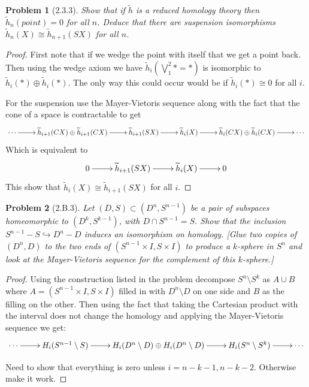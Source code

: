 \documentclass[10pt]{article}
\newcommand{\sk}{\vskip 10mm}
\newcommand{\rh}{\widetilde{h}}
\theoremstyle{plain}
\newtheorem{problem}{Problem}
\theoremstyle{remark}
\begin{document}
\sk

\begin{problem}[2.3.3]
  Show that if $\rh$ is a reduced homology theory then $\rh_n(point)=0$ for all
  $n$. Deduce that there are suspension isomorphisms $\rh_n(X)\cong\rh_{n+1}(SX)$
  for all $n$.
\end{problem}

\begin{proof}
  First note that if we wedge the point with itself that we get a point back.
  Then using the wedge axiom we have $\rh_i(\bigvee_1^2*=*)$ is isomorphic to
  $\rh_i(*)\oplus\rh_i(*)$. The only way this could occur would be if $\rh_i(*)\cong 0$
  for all $i$.

  For the suspension use the Mayer-Vietoris sequence along with the
  fact that the cone of a space is contractable to get
  \[
    \xymatrix{
      \cdots \ar[r] & \rh_{i+1}(CX)\oplus \rh_{i+1}(CX) \ar[r] & \rh_{i+1}(SX) \ar[r] & \rh_i(X) \ar[r] & \rh_i(CX)\oplus \rh_i(CX) \ar[r] & \cdots
    }
  \]
  Which is equivalent to
  \[
    \xymatrix{
      0 \ar[r] & \rh_{i+1}(SX) \ar[r] & \rh_i(X) \ar[r] & 0
      }
  \]
  This show that $\rh_i(X)\cong\rh_{i+1}(SX)$ for all $i$.
\end{proof}

\sk

\begin{problem}[2.B.3]
  Let $(D,S)\subset (D^n,S^{n-1})$ be a pair of subspaces homeomorphic to
  $(D^k,S^{k-1})$, with $D\cap S^{n-1}=S$. Show that the inclusion
  $S^{n-1}-S\hookrightarrow D^n-D$ induces an isomorphism on homology. [Glue two
  copies of $(D^n,D)$ to the two ends of $(S^{n-1}\times I,S\times I)$ to
  produce a $k$-sphere in $S^n$ and look at the Mayer-Vietoris sequence for the
  complement of this $k$-sphere.]
\end{problem}

\begin{proof}
  Using the construction listed in the problem decompose $S^n\setminus S^k$ as $A\cup B$
  where $A=(S^{n-1}\times I,S\times I)$ filled in with $D^n\setminus D$ on one side and $B$ as the
  filling on the other. Then using the fact that taking the Cartesian product
  with the interval does not change the homology and applying the Mayer-Vietoris
  sequence we get:
  \[
    \xymatrix{
      \cdots \ar[r] & H_i(S^{n-1}\setminus S) \ar[r] & H_i(D^n\setminus D)\oplus H_i(D^n\setminus D) \ar[r] & H_i(S^n\setminus S^k) \ar[r] & \cdots
    }
  \]

  Need to show that everything is zero unless $i=n-k-1,n-k-2$. Otherwise
  make it work.
\end{proof}

\end{document}
